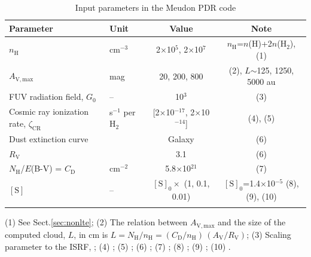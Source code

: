 \documentclass[]{aastex631}
\begin{document}
\begin{table}[ht]
    \begin{center}
    \caption{Input parameters in the Meudon PDR code}
    \begin{tabular}{llcc}
       \toprule
       Parameter  & Unit & Value & Note  \\
       \midrule
       $n_\mathrm{H}$  & cm$^{-3}$ & 2$\times$10$^5$,
       2$\times$10$^7$  & $n_\mathrm{H}$=$n$(H)+2$n$(H$_2$), (1)  \\ 
       $A_\mathrm{V,max}$ & mag & 20, 200, 800 & (2), $L$$\sim$125, 1250, 5000 au \\
       FUV radiation field, $G_0$ & -- & 10$^3$ & (3) \\
       Cosmic ray ionization rate, $\zeta_\mathrm{CR}$ & s$^{-1}$ per H$_2$ &[2$\times$10$^{-17}$, 2$\times$10$^{-14}$] & (4), (5)   \\
       Dust extinction curve & & Galaxy & (6) \\ %
       $R_\mathrm{V}$ & & 3.1 & (6) \\
       $N_\mathrm{H}$/$E$(B-V) = $C_\mathrm{D}$ & cm$^{-2}$ & 5.8$\times$10$^{21}$ & (7) \\ %
       $\left [\mathrm{S}  \right ]$ & -- & $\left [\mathrm{S}  \right ]_0  \times$ (1, 0.1, 0.01)  & $\left [\mathrm{S}  \right ]_0$=1.4$\times$10$^{-5}$ (8), (9), (10) \\
       
       \bottomrule       
        \label{tab:MeudonPDR}
    \end{tabular}
    \end{center}
    \par \vspace{0.05in}
    (1) See Sect.\ref{sec:nonlte}; (2) The relation between $A_\mathrm{V, max}$ and the size of the computed cloud, $L$, in cm is \mbox{$L=N_\mathrm{H}/n\mathrm{_H}=(C_\mathrm{D}/n_\mathrm{H})\,(A_\mathrm{V}/R_\mathrm{V})$}; (3) Scaling parameter to the ISRF, \citet{Mathis1983}; (4) \citet{Indriolo2015}; (5) \citet{LePetit2016}; (6) \citet{Fitzpatrick2007}; (7) \citet{Bohlin1978};  (8) \citet{Asplund2009}; (9) \citet{Goicoechea2021}; (10) \citet{Fuente2023}.
    \par
\end{table}
\end{document}
